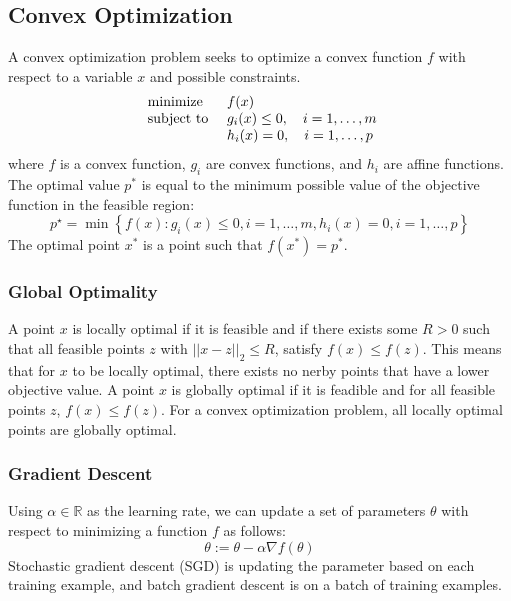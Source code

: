 \documentclass[twoside,twocolumn]{article}
\begin{document}
\subsection{Convex Optimization}
A convex optimization problem seeks to optimize a convex function $f$ with
respect to a variable $x$ and possible constraints.
\begin{equation}
  \begin{array} { l l } { \text { minimize } } & { f ( x ) } \\ { \text { subject to } } & { g _ { i } ( x ) \leq 0 , \quad i = 1 , \ldots , m } \\ { } & { h _ { i } ( x ) = 0 , \quad i = 1 , \ldots , p } \end{array}
\end{equation}
where $f$ is a convex function, $g_i$ are convex functions, and $h_i$ are affine
functions. The optimal value $p^*$ is equal to the minimum possible value of
the objective function in the feasible region:
\begin{equation}
  p ^ { \star } = \min \left\{ f ( x ) : g _ { i } ( x ) \leq 0 , i = 1 , \ldots , m , h _ { i } ( x ) = 0 , i = 1 , \ldots , p \right\}
\end{equation}
The optimal point $x^*$ is a point such that $f(x^*) = p^*$.
\subsubsection{Global Optimality}
A point $x$ is locally optimal if it is feasible and if there exists some
$R > 0$ such that all feasible points $z$ with $||x-z||_2 \leq R$, satisfy
$f(x) \leq f(z)$. This means that for $x$ to be locally optimal, there
exists no nerby points that have a lower objective value. A point $x$ is globally
optimal if it is feadible and for all feasible points $z$, $f(x) \leq f(z)$.
For a convex optimization problem, all locally optimal points are globally
optimal.
\subsubsection{Gradient Descent}
Using $\alpha \in \mathbb{R}$ as the learning rate, we can update a set of
parameters $\theta$ with respect to minimizing a function $f$ as follows:
\begin{equation}
  \theta := \theta-\alpha\nabla f(\theta)
\end{equation}
Stochastic gradient descent (SGD) is updating the parameter based on each
training example, and batch gradient descent is on a batch of training
examples.
\end{document}
